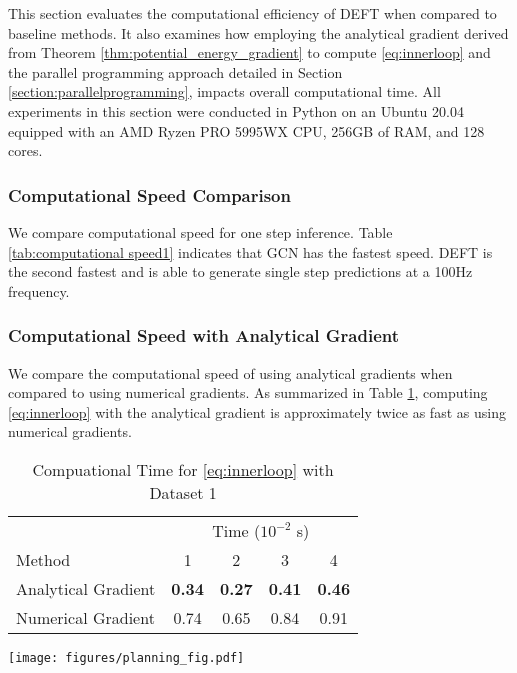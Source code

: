 This section evaluates the computational efficiency of DEFT when compared to baseline methods. 
It also examines how employing the analytical gradient derived from Theorem \ref{thm:potential_energy_gradient} to compute \eqref{eq:innerloop} and the parallel programming approach detailed in Section \ref{section:parallelprogramming}, impacts overall computational time. 
All experiments in this section were conducted in Python on an Ubuntu 20.04 equipped with an AMD Ryzen PRO 5995WX CPU, 256GB of RAM, and 128 cores.
\subsubsection{Computational Speed Comparison}
We compare computational speed for one step inference. 
Table \ref{tab:computational speed1} indicates that GCN has the fastest speed. 
DEFT is the second fastest and is able to generate single step predictions at a 100Hz frequency.
\subsubsection{Computational Speed with Analytical Gradient}
We compare the computational speed of using analytical gradients when compared to using numerical gradients. 
As summarized in Table \ref{tab:computational speed2}, computing \eqref{eq:innerloop} with the analytical gradient is approximately twice as fast as using numerical gradients.

\begin{table}[t]
        \centering
    \caption{Compuational Time for \eqref{eq:innerloop} with Dataset 1}
    \begin{tabular}{l||cccc}
        \toprule
        & \multicolumn{4}{c}{Time ($10^{-2}$ s)} \\         
        Method & 1 & 2 & 3 & 4   \\
        \hline
        Analytical Gradient & \textbf{0.34} & \textbf{0.27} & \textbf{0.41} & \textbf{0.46}  \\
        Numerical Gradient & 0.74 & 0.65 & 0.84 & 0.91 \\
        \bottomrule
    \end{tabular}
    \label{tab:computational speed2}
    \centering
\end{table}
\begin{figure*}[t]
    \centering
    \texttt{[image: figures/planning\_fig.pdf]}
    \caption{Visualization of planning for BDLO 1 for two manipulation tasks, using DEFT, a DEFT ablation that leaves out the constraint described in Theorem \ref{thm:junctionconstraint}, and Tree-LSTM.
    The BDLO’s goal configuration is highlighted in yellow, while the target hole is shown in red. 
    The DEFT model enables the planning algorithm to successfully complete the task, whereas the ablation approach of DEFT and the Tree-LSTM model both fail to finish tasks.}    
    \label{fig:planning_demo}
\end{figure*}
